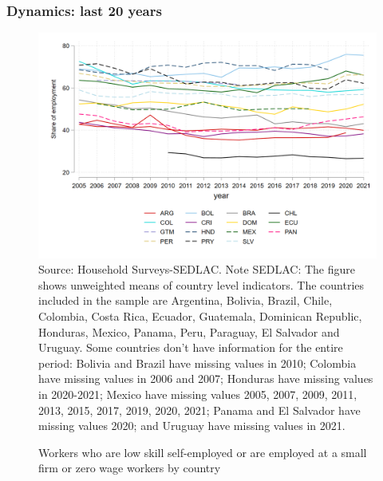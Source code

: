\documentclass{beamer}
\begin{document}
\begin{frame}
\frametitle{Dynamics: last 20 years}
\begin{figure}[!htb]
        \justifying
        \caption{Workers who are low skill self-employed or are employed at a small firm or zero wage workers by country}     
        \includegraphics[scale=.2]{latex/figures/Evolution/informal_pr_all.png}
        \label{fig:Evolution_informalpr}
        \footnotesize{Source: Household Surveys-SEDLAC.}
       \footnotesize{Note SEDLAC: The figure shows unweighted means of country level indicators. The countries included in the sample are Argentina, Bolivia, Brazil, Chile, Colombia, Costa Rica, Ecuador, Guatemala, Dominican Republic, Honduras, Mexico, Panama, Peru, Paraguay, El Salvador and Uruguay. Some countries don’t have information for the entire period: Bolivia and Brazil have missing values in 2010; Colombia have missing values in 2006 and 2007; Honduras have missing values in 2020-2021; Mexico have missing values 2005, 2007, 2009, 2011, 2013, 2015, 2017, 2019, 2020, 2021; Panama and El Salvador have missing values 2020; and Uruguay have missing values in 2021.}
 \end{figure}
 \end{frame}
\end{document}
